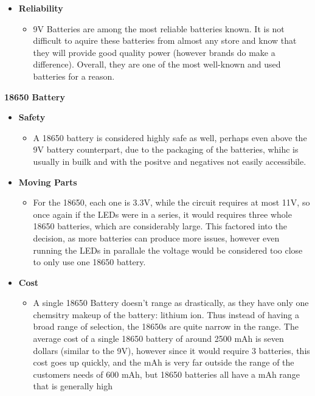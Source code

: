 \documentclass[12pt]{article}
\begin{document}
{{{{{{\begin{itemize}
\begin{itemize}
					\end{itemize}
					\item \textbf{Reliability}
					\begin{itemize}
						\item 9V Batteries are among the most reliable batteries known. It is not difficult to aquire these batteries from almost any store and know that they will provide good quality power (however brands do make a difference). Overall, they are one of the most well-known and used batteries for a reason.
					\end{itemize}
				\end{itemize}
			
	\noindent\textbf{18650 Battery}
		{\renewcommand\labelitemi{}
			\begin{itemize}
				\item \textbf{Safety}
				\begin{itemize}
					\item A 18650 battery is considered highly safe as well, perhaps even above the 9V battery counterpart, due to the packaging of the batteries, whihc is usually in builk and with the positve and negatives not easily accessibile. 
				\end{itemize}
				\item \textbf{Moving Parts}
				\begin{itemize}
					\item For the 18650, each one is 3.3V, while the circuit requires at most 11V, so once again if the LEDs were in a series, it would requires three whole 18650 batteries, which are considerably large. This factored into the decision, as more batteries can produce more issues, however even running the LEDs in parallale the voltage would be considered too close to only use one 18650 battery.
				\end{itemize}
				\item \textbf{Cost}
				\begin{itemize}
					\item A single 18650 Battery doesn't range as drastically, as they have only one chemsitry makeup of the battery: lithium ion. Thus instead of having a broad range of selection, the 18650s are quite narrow in the range. The average cost of a single 18650 battery of around 2500 mAh is seven dollars (similar to the 9V), however since it would require 3 batteries, this cost goes up quickly, and the mAh is very far outside the range of the customers needs of 600 mAh, but 18650 batteries all have a mAh range that is generally high

\end{itemize}
\end{itemize}}}}}}}}
\end{document}
